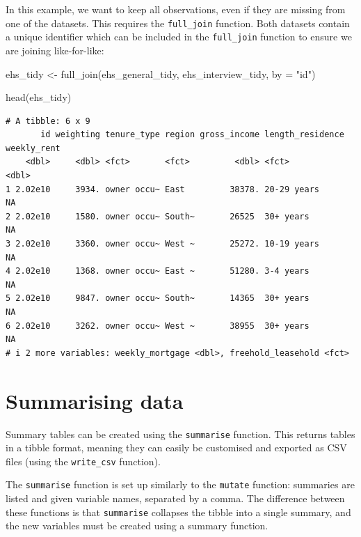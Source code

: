 \documentclass[
  letterpaper,
  DIV=11,
  numbers=noendperiod]{scrreprt}
\newenvironment{Shaded}{\begin{snugshade}}{\end{snugshade}}
\newcommand{\AttributeTok}[1]{\textcolor[rgb]{0.40,0.45,0.13}{#1}}
\newcommand{\FunctionTok}[1]{\textcolor[rgb]{0.28,0.35,0.67}{#1}}
\newcommand{\NormalTok}[1]{\textcolor[rgb]{0.00,0.23,0.31}{#1}}
\newcommand{\OtherTok}[1]{\textcolor[rgb]{0.00,0.23,0.31}{#1}}
\newcommand{\StringTok}[1]{\textcolor[rgb]{0.13,0.47,0.30}{#1}}
\begin{document}
In this example, we want to keep all observations, even if they are
missing from one of the datasets. This requires the \texttt{full\_join}
function. Both datasets contain a unique identifier which can be
included in the \texttt{full\_join} function to ensure we are joining
like-for-like:

\begin{Shaded}
\begin{Highlighting}[]
\NormalTok{ehs\_tidy }\OtherTok{\textless{}{-}} \FunctionTok{full\_join}\NormalTok{(ehs\_general\_tidy, ehs\_interview\_tidy,}
                      \AttributeTok{by =} \StringTok{"id"}\NormalTok{) }

\FunctionTok{head}\NormalTok{(ehs\_tidy)}
\end{Highlighting}
\end{Shaded}

\begin{verbatim}
# A tibble: 6 x 9
       id weighting tenure_type region gross_income length_residence weekly_rent
    <dbl>     <dbl> <fct>       <fct>         <dbl> <fct>                  <dbl>
1 2.02e10     3934. owner occu~ East         38378. 20-29 years               NA
2 2.02e10     1580. owner occu~ South~       26525  30+ years                 NA
3 2.02e10     3360. owner occu~ West ~       25272. 10-19 years               NA
4 2.02e10     1368. owner occu~ East ~       51280. 3-4 years                 NA
5 2.02e10     9847. owner occu~ South~       14365  30+ years                 NA
6 2.02e10     3262. owner occu~ West ~       38955  30+ years                 NA
# i 2 more variables: weekly_mortgage <dbl>, freehold_leasehold <fct>
\end{verbatim}

\section{Summarising data}\label{summarising-data}

Summary tables can be created using the \texttt{summarise} function.
This returns tables in a tibble format, meaning they can easily be
customised and exported as CSV files (using the \texttt{write\_csv}
function).

The \texttt{summarise} function is set up similarly to the
\texttt{mutate} function: summaries are listed and given variable names,
separated by a comma. The difference between these functions is that
\texttt{summarise} collapses the tibble into a single summary, and the
new variables must be created using a summary function.
\end{document}
